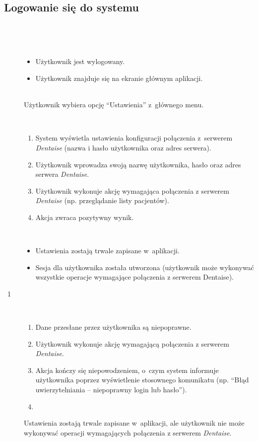 \documentclass[11pt]{aghdpl}
\begin{document}
\subsection{Logowanie się do systemu}
	
	\begin{description}
		\item[\useCaseAktor] \hfill \\
			\useCaseUzytkownik
		\item[\useCaseWarPocz] \hfill \\
			\begin{itemize}
				\item Użytkownik jest wylogowany.
				\item Użytkownik znajduje się na ekranie głównym aplikacji.
			\end{itemize}
		\item[\useCaseZdarzInicj] \hfill \\
			Użytkownik wybiera opcję ``Ustawienia'' z~głównego menu.
		\item[\useCaseScenBaz] \hfill \\ 
			\begin{enumerate}
				\item System wyświetla ustawienia konfiguracji połączenia z~serwerem \emph{Dentaise} (nazwa i hasło użytkownika oraz adres serwera).
				\item Użytkownik wprowadza swoją nazwę użytkownika, hasło oraz adres serwera \emph{Dentaise}.
				\item Użytkownik wykonuje akcję wymagająca połączenia z serwerem \emph{Dentaise} (np. przeglądanie listy pacjentów).
				\item Akcja zwraca pozytywny wynik.
			\end{enumerate}
		\item[\useCaseWarKonc] \hfill \\ 
			\begin{itemize}
				\item Ustawienia zostają trwale zapisane w~aplikacji.
				\item Sesja dla użytkownika została utworzona (użytkownik może wykonywać wszystkie operacje wymagające połączenia z serwerem Dentaise).
			\end{itemize}
		\item[\useCaseWyjatek~1] \hfill \\
			\begin{enumerate}[label=2a\arabic*.]
				\item Dane przesłane przez użytkownika są niepoprawne.
				\item Użytkownik wykonuje akcję wymagającą połączenia z serwerem \emph{Dentaise}.
				\item Akcja kończy się niepowodzeniem, o~czym system informuje użytkownika poprzez wyświetlenie stosownego komunikatu (np. ``Błąd uwierzytelniania -- niepoprawny login lub hasło'').
				\item \useCaseEnd
			\end{enumerate}
			Ustawienia zostają trwale zapisane w~aplikacji, ale użytkownik nie może wykonywać operacji wymagających połączenia z serwerem \emph{Dentaise}.
	\end{description}
\end{document}
